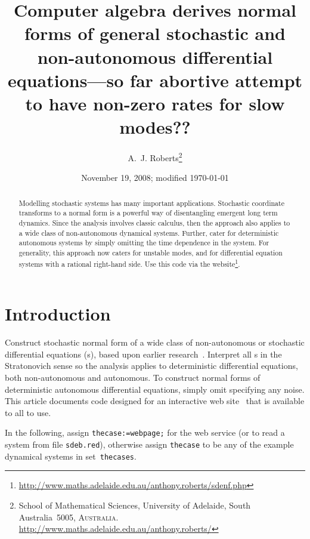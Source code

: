 \documentclass[11pt,a5paper]{article}
\title{Computer algebra derives normal forms of general stochastic and non-autonomous differential equations---so far abortive attempt to have non-zero rates for slow modes??}
\author{A.~J. Roberts\thanks{School of Mathematical Sciences, University of Adelaide, South Australia~5005, \textsc{Australia}.
\url{http://www.maths.adelaide.edu.au/anthony.roberts/}}}
\date{November 19, 2008; modified \today}
\begin{document}
\maketitle


\begin{abstract}
Modelling stochastic systems has many important applications.
Stochastic coordinate transforms to a normal form is a powerful way of disentangling emergent long term dynamics.
Since the analysis involves classic calculus, then the approach also applies to a wide class of non-autonomous dynamical systems.
Further, cater for deterministic autonomous systems by simply omitting the time dependence in the system.
For generality, this approach now caters for unstable modes, and for differential equation systems with a rational right-hand side.
Use this code via the website\footnote{\url{http://www.maths.adelaide.edu.au/anthony.roberts/sdenf.php}}.
\end{abstract}

\tableofcontents

\section{Introduction}

Construct stochastic normal form of a wide class of non-autonomous or stochastic differential equations (\sde{}s), based upon earlier research~\cite[]{Cox91, Chao95, Roberts06k}.
Interpret all \sde{}s in the Stratonovich sense so the analysis applies to deterministic differential equations, both non-autonomous and autonomous.
To construct normal forms of deterministic autonomous differential equations, simply omit specifying any noise.
This article documents code designed for an interactive web site~\cite[]{Roberts07d} that is available to all to use.


In the following, assign \verb|thecase:=webpage;| for the web service (or to read a system from file \verb|sdeb.red|), otherwise assign \verb|thecase| to be any of the example dynamical systems in set~\verb|thecases|.
\end{document}
